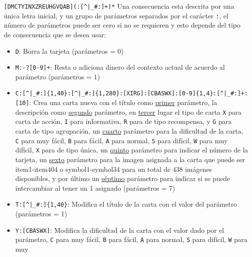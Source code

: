 \begin{definition}
	{\Large\color{blue} \verb/[DMCTYINXZREUHGVQAB](:[^|_#:]+)*/}
	Una consecuencia esta descrita por una única letra inicial, y un grupo de parámetros separados por el 
	carácter {\Large\color{blue} \verb/:/}, el número de parámetros puede ser cero si no se requieren y 
	esto depende del tipo de consecuencia que se desea usar:

	\begin{itemize}
		\item {\Large\color{blue} \verb/D/}: Borra la tarjeta (parámetros = 0)
		\item {\Large\color{blue} \verb/M:-?[0-9]+/}: Resta o adiciona dinero del contexto actual de 
			acuerdo al parámetro (parámetros = 1)
		\item {\small\color{blue} \verb/C:[^|_#:]{1,40}:[^|_#:]{1,280}:[XIRG]:[CBASWX]:[0-9]{1,4}:[^|_#:]+:[10]/}: 
			Crea una carta nueva con el título como \uline{primer} parámetro, la descripción como 
			\uline{segundo} parámetro, en \uline{tercer} lugar el tipo de carta 
			{\Large\color{blue} \verb/X/} para carta de acción, {\Large\color{blue} \verb/I/} para 
			informativa, {\Large\color{blue} \verb/R/} para de tipo recompensa, y 
			{\Large\color{blue} \verb/G/} para carta de tipo agrupación, un \uline{cuarto} 
			parámetro para la dificultad de la carta, {\Large\color{blue} \verb/C/} para muy fácil,
			{\Large\color{blue} \verb/B/} para fácil, {\Large\color{blue} \verb/A/} para normal,
			{\Large\color{blue} \verb/S/} para difícil, {\Large\color{blue} \verb/W/} para muy 
			difícil, {\Large\color{blue} \verb/X/} para de tipo única, un \uline{quinto} parámetro 
			para indicar el número de la tarjeta, un \uline{sexto} parámetro para la imagen 
			asignada a la carta que puede ser item1-item404 o symbol1-symbol34 para un total de 
			438 imágenes disponibles, y por último un \uline{séptimo} parámetro para indicar si se 
			puede intercambiar al tener un 1 asignado (parámetros = 7)
		\item {\Large\color{blue} \verb/T:[^|_#:]{1,40}/}: Modifica el título de la carta con el valor del 
			parámetro (parámetros = 1)
		\item {\Large\color{blue} \verb/Y:[CBASWX]/}: Modifica la dificultad de la carta con el valor 
			dado por el parámetro, {\Large\color{blue} \verb/C/} para muy fácil, 
			{\Large\color{blue} \verb/B/} para fácil, {\Large\color{blue} \verb/A/} para normal, 
			{\Large\color{blue} \verb/S/} para difícil, {\Large\color{blue} \verb/W/} para muy 

\end{itemize}
\end{definition}
